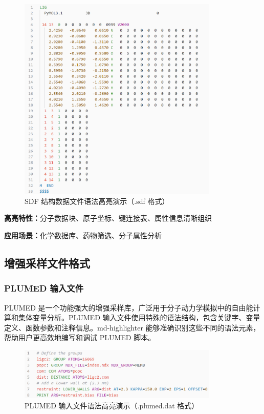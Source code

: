 \begin{figure}[!h]
    \centering
    \includegraphics[width=0.85\textwidth]{../images/sdf.png}
    \caption{SDF 结构数据文件语法高亮演示（.sdf 格式）}
    \label{fig:sdf-highlighting}
\end{figure}

\textbf{高亮特性：}分子数据块、原子坐标、键连接表、属性信息清晰组织

\textbf{应用场景：}化学数据库、药物筛选、分子属性分析

\subsection{增强采样文件格式}

\subsubsection{PLUMED 输入文件}

PLUMED 是一个功能强大的增强采样库，广泛用于分子动力学模拟中的自由能计算和集体变量分析。PLUMED 输入文件使用特殊的语法结构，包含关键字、变量定义、函数参数和注释信息。md-highlighter 能够准确识别这些不同的语法元素，帮助用户更高效地编写和调试 PLUMED 脚本。

\begin{figure}[!h]
    \centering
    \includegraphics[width=0.85\textwidth]{../images/plumed.png}
    \caption{PLUMED 输入文件语法高亮演示（.plumed.dat 格式）}
    \label{fig:plumed-highlighting}
\end{figure}

